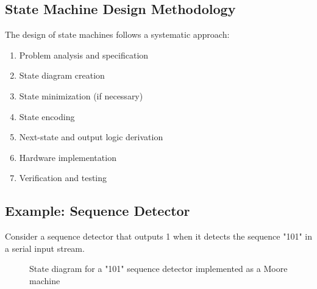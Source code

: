 \subsection{State Machine Design Methodology}

The design of state machines follows a systematic approach:

\begin{enumerate}
    \item Problem analysis and specification
    \item State diagram creation
    \item State minimization (if necessary)
    \item State encoding
    \item Next-state and output logic derivation
    \item Hardware implementation
    \item Verification and testing
\end{enumerate}

\subsection*{Example: Sequence Detector}

Consider a sequence detector that outputs 1 when it detects the sequence "101" in a serial input stream.

\begin{figure}[h]
    \centering
    \caption{State diagram for a "101" sequence detector implemented as a Moore machine}
    \label{fig:sequence_detector}
\end{figure}

